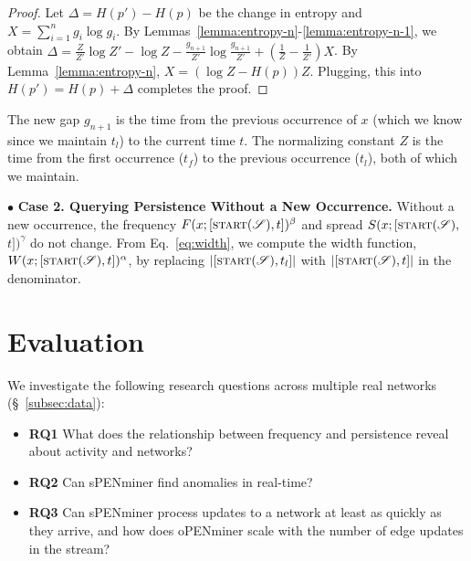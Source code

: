 \documentclass[sigconf]{acmart}
\newcommand{\methodOffline}{oPENminer\xspace}
\newcommand{\methodOnline}{sPENminer\xspace}
\newcommand{\timestamp}{t}
\newcommand{\stream}{\mathscr{S}}
\newcommand{\streamStart}{\textsc{start}(\stream)}
\newcommand{\pattern}{x}
\newcommand{\firstOcc}{t_f}
\newcommand{\lastOcc}{t_l}
\newcommand{\freq}{F}
\newcommand{\width}{W}
\newcommand{\spread}{S}
\newcommand{\entropy}{H}
\newcommand{\gap}{g}
\newcommand{\wExp}{\alpha}
\newcommand{\fExp}{\beta}
\newcommand{\sExp}{\gamma}
\newcommand{\rOne}{\textbf{RQ1}}
\newcommand{\rTwo}{\textbf{RQ2}}
\newcommand{\rThree}{\textbf{RQ3}}
\begin{document}
\begin{proof}
    Let $\Delta = \entropy(p') - \entropy(p)$ be the change in entropy and  $X = \sum_{i=1}^n \gap_i\log \gap_i$.
    By Lemmas~\ref{lemma:entropy-n}-\ref{lemma:entropy-n-1}, we obtain $\Delta = \frac{Z}{Z'}\log Z' -\log Z - \frac{\gap_{n+1}}{Z'}\log\frac{\gap_{n+1}}{Z'} + \left(\frac{1}{Z}-\frac{1}{Z'}\right)X$. 
    By Lemma~\ref{lemma:entropy-n}, 
    $X = (\log Z - \entropy(p))Z$. 
    Plugging, this into $\entropy(p') = \entropy(p) + \Delta$ completes the proof.
\end{proof}

The new gap $\gap_{n+1}$ is the time from the previous occurrence of $\pattern$ (which we know since we maintain $\lastOcc$) to the current time $\timestamp$. The normalizing constant $Z$ is the time from the first occurrence ($\firstOcc$) to the previous occurrence ($\lastOcc$), both of which we maintain.

$\bullet$ \textbf{Case 2. Querying Persistence 
Without a New Occurrence.}
Without a new occurrence, the frequency
$\freq(\pattern;[\streamStart,\timestamp])^\fExp$ and 
spread 
$\spread(\pattern;[\streamStart,$$\timestamp])^\sExp$ do not change. From Eq.~\eqref{eq:width}, we compute the width function,   $\width(\pattern;[\streamStart,\timestamp])^\wExp$, by replacing $|[\streamStart,\lastOcc]|$ with $|[\streamStart,\timestamp]|$ in the denominator.

\section{Evaluation}
\label{sec:eval}
We investigate the following research questions across multiple real networks (\S~\ref{subsec:data}):

\begin{itemize}
    \item \rOne{} What does the relationship between frequency and persistence reveal about activity and networks? 
    \item \rTwo{} Can \methodOnline{} find anomalies in real-time?
    \item \rThree{} Can \methodOnline{} process updates to a network at least as quickly as they arrive, and how does \methodOffline{} scale with the number of edge updates in the stream?
\end{itemize}
\end{document}
